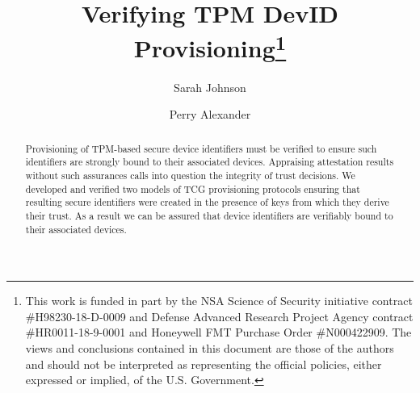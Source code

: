 \documentclass[runningheads]{llncs}
\begin{document}
%
\title{Verifying TPM DevID Provisioning\thanks{This work is funded in part
    by the NSA Science of Security initiative contract
    \#H98230-18-D-0009 and Defense Advanced Research Project Agency
    contract \#HR0011-18-9-0001 and Honeywell FMT Purchase Order
    \#N000422909. The views and conclusions contained in this document
    are those of the authors and should not be interpreted as
    representing the official policies, either expressed or implied,
    of the U.S. Government.}}
%
%
\author{Sarah Johnson \and
Perry Alexander}
%
%
%
\maketitle              %
%
\begin{abstract}
  Provisioning of TPM-based secure device identifiers must be
  verified to ensure such identifiers are strongly bound to their
  associated devices.  Appraising attestation results without such
  assurances calls into question the integrity of trust decisions.  We
  developed and verified two models of TCG provisioning protocols
  ensuring that resulting secure identifiers were created in the
  presence of keys from which they derive their trust.  As a result we
  can be assured that device identifiers are verifiably bound to their
  associated devices.

\end{abstract}
%
%
%
\end{document}
